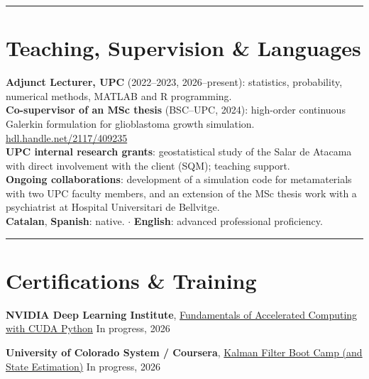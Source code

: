 \documentclass[10pt,a4paper]{article}
\newcommand{\ruledsection}[1]{%
  \par\vspace{3pt}%
  {\color{hair}\rule{\textwidth}{0.6pt}}%
  \vspace{-3pt}%
  \section{#1}%
}
\newcommand{\dates}[1]{{\sffamily\fontsize{8.8}{10.5}\selectfont\color{muted}#1}}
\newcommand{\org}[1]{{\color{ink}\textbf{#1}}}
\begin{document}

\ruledsection{Teaching, Supervision \& Languages}
\org{Adjunct Lecturer, UPC} \dates{(2022--2023, 2026--present)}: statistics, probability, numerical methods, MATLAB and R programming.\\[3pt]
\org{Co-supervisor of an MSc thesis} \dates{(BSC--UPC, 2024)}: high-order continuous Galerkin formulation for glioblastoma growth simulation. \href{https://hdl.handle.net/2117/409235}{\color{accent}hdl.handle.net/2117/409235}\\[3pt]
\org{UPC internal research grants}: geostatistical study of the Salar de Atacama with direct involvement with the client (SQM); teaching support.\\[3pt]
\org{Ongoing collaborations}: development of a simulation code for metamaterials with two UPC faculty members, and an extension of the MSc thesis work with a psychiatrist at Hospital Universitari de Bellvitge.\\[3pt]
\org{Catalan}, \org{Spanish}: native. \textcolor{hair}{$\cdot$} \org{English}: advanced professional proficiency.


\ruledsection{Certifications \& Training}

\org{NVIDIA Deep Learning Institute},
\href{https://learn.nvidia.com/courses/course-detail?course_id=course-v1:DLI+S-AC-10+V1}
     {\color{accent}Fundamentals of Accelerated Computing with CUDA Python}
\dates{In progress, 2026}

\par\vspace{6pt}

\org{University of Colorado System / Coursera},
\href{https://www.coursera.org/learn/kalman-filter-boot-camp-state-estimation}
     {\color{accent}Kalman Filter Boot Camp (and State Estimation)}
\dates{In progress, 2026}
\end{document}
